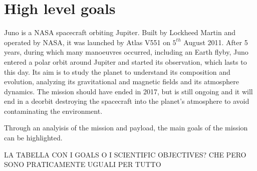 \section{High level goals}
\label{sec:goals}

Juno is a NASA spacecraft orbiting Jupiter. Built by Lockheed Martin and operated by NASA, it was launched by Atlas V551 on $5^{th}$ August 2011. After 5 years, during which many manoeuvres occurred, including an Earth flyby, Juno entered a polar orbit around Jupiter and started its observation, which lasts to this day. Its aim is to study the planet to understand its composition and evolution, analyzing its gravitational and magnetic fields and its atmosphere dynamics. The mission should have ended in 2017, but is still ongoing and it will end in a deorbit destroying the spacecraft into the planet's atmosphere to avoid contaminating the environment. 


Through an analyisis of the mission and payload, the main goals of the mission can be highlighted.


LA TABELLA CON I GOALS O I SCIENTIFIC OBJECTIVES? CHE PERO SONO PRATICAMENTE UGUALI PER TUTTO

